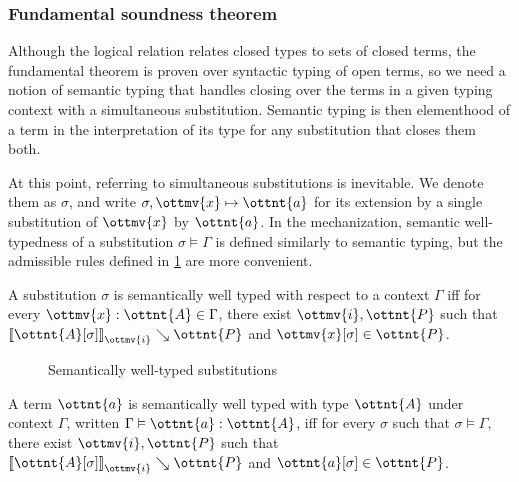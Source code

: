 \documentclass[a4paper,UKenglish,cleveref,autoref,thm-restate]{lipics-v2021}
\begin{document}
\subsubsection{Fundamental soundness theorem}

Although the logical relation relates closed types to sets of closed terms,
the fundamental theorem is proven over syntactic typing of open terms,
so we need a notion of semantic typing that handles closing over the terms
in a given typing context with a simultaneous substitution.
Semantic typing is then elementhood of a term in the interpretation of its type
for any substitution that closes them both.

At this point, referring to simultaneous substitutions is inevitable.
We denote them as $\sigma$, and write $ \sigma ,  \ottmv{x}  \mapsto  \ottnt{a} $
for its extension by a single substitution of $\ottmv{x}$ by $\ottnt{a}$.
In the mechanization, semantic well-typedness of a substitution $ \sigma  \vDash  \Gamma $
is defined similarly to semantic typing,
but the admissible rules defined in \cref{fig:sem:subst} are more convenient.

\begin{definition}
  A substitution $\sigma$ is semantically well typed
  with respect to a context $\Gamma$ iff for every $ \ottmv{x}  \mathrel{:}  \ottnt{A}  \in  \Gamma $,
  there exist $\ottmv{i}, \ottnt{P}$ such that
  $ \mathopen{\llbracket}   \ottnt{A} [  \sigma  ]   \mathclose{\rrbracket}_{ \ottmv{i} } \searrow  \ottnt{P} $ and $  \ottmv{x} [  \sigma  ]   \in  \ottnt{P} $.
\end{definition}

\begin{figure}
\caption{Semantically well-typed substitutions}
\label{fig:sem:subst}
\end{figure}

\begin{definition}
  A term $\ottnt{a}$ is semantically well typed with type $\ottnt{A}$ under context $\Gamma$,
  written $ \Gamma  \vDash  \ottnt{a}  :  \ottnt{A} $, iff for every $\sigma$ such that $ \sigma  \vDash  \Gamma $,
  there exist $\ottmv{i}, \ottnt{P}$ such that
  $ \mathopen{\llbracket}   \ottnt{A} [  \sigma  ]   \mathclose{\rrbracket}_{ \ottmv{i} } \searrow  \ottnt{P} $ and $  \ottnt{a} [  \sigma  ]   \in  \ottnt{P} $.
\end{definition}
\end{document}
